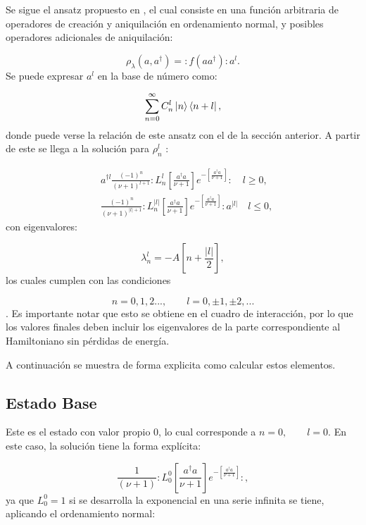 \documentclass[a4paper,10pt]{report}
\begin{document}
Se sigue el ansatz propuesto en \cite{EnglertDB}, el cual consiste en una función arbitraria de operadores de creación y aniquilación en ordenamiento normal, y posibles operadores adicionales de aniquilación:

\begin{equation}\label{Englert1993}
\rho_\lambda (a,a^\dagger) = :f(aa^\dagger):a^l.
\end{equation} Se puede expresar $a^l$ en la base de número como:

\begin{equation}
\sum_{n=0}^\infty C_n^l\Ket{n}\Bra{n+l},
\end{equation} donde puede verse la relación de este ansatz con el de la sección anterior. A partir de este se llega a la solución para $\rho_n^l$ \cite{EnglertDB}:

\begin{align}\label{DefDB}
&a^{\dagger l}\frac{(-1)^n}{(\nu+1)^{l+1}}:L_n^l[\frac{a^\dagger a}{\nu+1}]e^{-[\frac{a^\dagger a}{\nu+1}]}:\quad l \geq 0, \\
&\frac{(-1)^n}{(\nu+1)^{|l|+1}}:L_n^{|l|}[\frac{a^\dagger a}{\nu+1}]e^{-[\frac{a^\dagger a}{\nu+1}]}:a^{|l|}\quad l \leq 0,
\end{align} con eigenvalores:

\begin{equation}
\lambda_n^l = -A[n + \frac{|l|}{2}],
\end{equation} los cuales cumplen con las condiciones

\begin{equation}
n=0,1,2...,\qquad l = 0,\pm 1, \pm 2,... 
\end{equation}. Es importante notar que esto se obtiene en el cuadro de interacción, por lo que los valores finales deben incluir los eigenvalores de la parte correspondiente al Hamiltoniano sin pérdidas de energía.

A continuación se muestra de forma explicita como calcular estos elementos. 

\subsection{Estado Base}

Este es el estado con valor propio 0, lo cual corresponde a $n=0, \qquad l=0$. En este caso, la solución tiene la forma explícita:

\begin{equation}
\frac{1}{(\nu+1)}:L_0^0[\frac{a^\dagger a}{\nu+1}]e^{-[\frac{a^\dagger a}{\nu+1}]}:,
\end{equation} ya que $L_0^0 = 1$ \cite{ArfkenMM} si se desarrolla la exponencial en una serie infinita se tiene, aplicando el ordenamiento normal:
\end{document}
